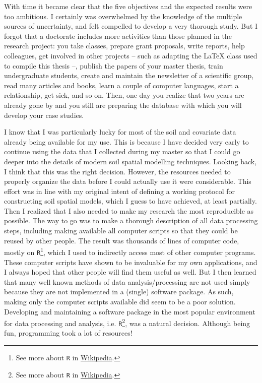 With time it became clear that the five objectives and the expected results were too ambitious. I certainly was 
overwhelmed by the knowledge of the multiple sources of uncertainty, and felt compelled to develop a very 
thorough study. But I forgot that a doctorate includes more activities than those planned in the research 
project: you take classes, prepare grant proposals, write reports, help colleagues, get involved in other 
projects -- such as adapting the \LaTeX{}\footlatex{} class used to compile this thesis --, publish the papers 
of your master thesis, train undergraduate students, create and maintain the newsletter of a scientific group, 
read many articles and books, learn a couple of computer languages, start a relationship, get sick, and so on. 
Then, one day you realize that two years are already gone by and you still are preparing the database with 
which you will develop your case studies.

\def\footr{\footnote{See more about \texttt{R} in 
\href{https://en.wikipedia.org/wiki/R_\%28programming_language\%29}{Wikipedia}.}}

I know that I was particularly lucky for most of the soil and covariate data already being available for my 
use. This is because I have decided very early to continue using the data that I collected during my master so 
that I could go deeper into the details of modern soil spatial modelling techniques. Looking back, I think that 
this was the right decision. However, the resources needed to properly organize the data before I could 
actually use it were considerable. This effort was in line with my original intent of defining a working 
protocol for constructing soil spatial models, which I guess to have achieved, at least partially. Then I 
realized that I also needed to make my research the most reproducible as possible. The way to go was to make a 
thorough description of all data processing steps, including making available all computer scripts so that they 
could be reused by other people. The result was thousands of lines of computer code, mostly on 
\texttt{R}\footr{}, which I used to indirectly access most of other computer programs. These computer scripts 
have shown to be invaluable for my own applications, and I always hoped that other people will find them useful 
as well. But I then learned that many well known methods of data analysis/processing are not used simply 
because they are not implemented in a (single) software package. As such, making only the computer scripts 
available did seem to be a poor solution. Developing and maintaining a software package in the most popular 
environment for data processing and analysis, i.e. \texttt{R}\footr{}, was a natural decision. Although being 
fun, programming took a lot of resources!

